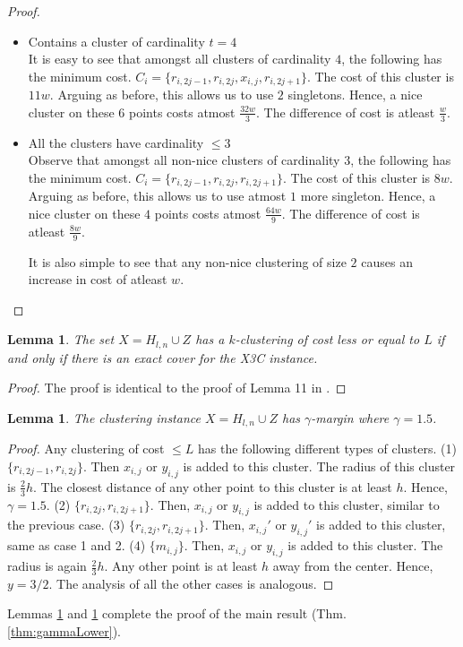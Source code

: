 \documentclass{article}
\newtheorem{lemma}[theorem]{Lemma}
\begin{document}
\begin{proof}
\begin{itemize}[nolistsep,leftmargin=*]
\item Contains a cluster of cardinality $t = 4$\\
It is easy to see that amongst all clusters of cardinality $4$, the following has the minimum cost. $C_i = \{r_{i, 2j-1}, r_{i, 2j}, x_{i,j}, r_{i, 2j+1}\}$. The cost of this cluster is $11w$. Arguing as before, this allows us to use $2$ singletons. Hence, a nice cluster on these $6$ points costs atmost $\frac{32w}{3}$. The difference of cost is atleast $\frac{w}{3}$.

\item All the clusters have cardinality $\le 3$ \\
Observe that amongst all non-nice clusters of cardinality $3$, the following has the minimum cost. $C_i = \{r_{i, 2j-1}, r_{i, 2j}, r_{i, 2j+1}\}$. The cost of this cluster is $8w$. Arguing as before, this allows us to use atmost $1$ more singleton. Hence, a nice cluster on these $4$ points costs atmost $\frac{64w}{9}$. The difference of cost is atleast $\frac{8w}{9}$.

It is also simple to see that any non-nice clustering of size $2$ causes an increase in cost of atleast $w$.

\end{itemize}
\end{proof}

\begin{lemma}
\label{lemma:kmeansEquivalenceX3C}
The set $X = H_{l,n} \cup Z$ has a $k$-clustering of cost less or equal to $L$ if and only if there is an exact cover for the X3C instance.
\end{lemma}
\begin{proof}
The proof is identical to the proof of Lemma 11 in \cite{vattani2009hardness}.
\end{proof}

\begin{lemma}
\label{lemma:gammaLower}
The clustering instance $X = H_{l,n} \cup Z$ has $\gamma$-margin where $\gamma = 1.5$.
\end{lemma}
\begin{proof}
Any clustering of cost $\le L$ has the following different types of clusters. (1) $\{r_{i,2j-1}, r_{i, 2j}\}$. Then $x_{i,j}$ or $y_{i,j}$ is added to this cluster. The radius of this cluster is $\frac{2}{3}h$. The closest distance of any other point to this cluster is at least $h$. Hence, $\gamma = 1.5$. (2) $\{r_{i,2j}, r_{i, 2j+1}\}$. Then, $x_{i,j}$ or $y_{i,j}$ is added to this cluster, similar to the previous case. 
(3) $\{r_{i,2j}, r_{i, 2j+1}\}$. Then, $x_{i,j}'$ or $y_{i,j}'$ is added to this cluster, same as case 1 and 2. (4) $\{m_{i,j}\}$. Then, $x_{i,j}$ or $y_{i,j}$ is added to this cluster. The radius is again $\frac{2}{3}h$. Any other point is at least $h$ away from the center. Hence, $y= 3/2$. The analysis of all the other cases is analogous.
\end{proof}
Lemmas \ref{lemma:kmeansEquivalenceX3C} and \ref{lemma:gammaLower} complete the proof of the main result (Thm. \ref{thm:gammaLower}). 
\end{document}
